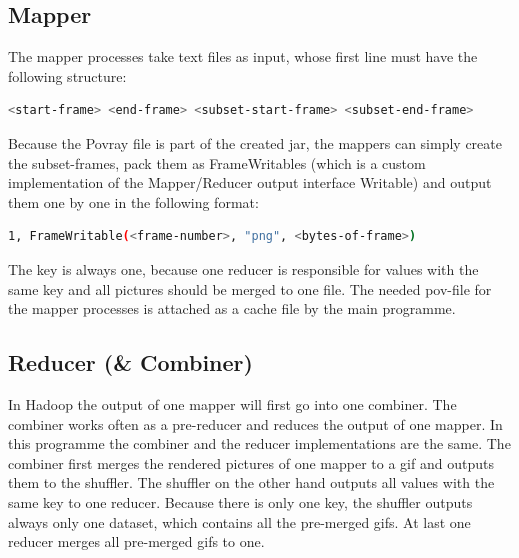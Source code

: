 \documentclass{article}
\begin{document}
\subsection{Mapper}

The mapper processes take text files as input, whose first line must have the following structure:

\begin{lstlisting}[language=bash, deletekeywords={cd}]
  <start-frame> <end-frame> <subset-start-frame> <subset-end-frame>
\end{lstlisting}

Because the Povray file is part of the created jar, the mappers can simply create the subset-frames, pack them as FrameWritables (which is a custom implementation of the Mapper/Reducer output interface Writable) and output them one by one in the following format:

\begin{lstlisting}[language=bash, deletekeywords={cd}]
  1, FrameWritable(<frame-number>, "png", <bytes-of-frame>)
\end{lstlisting}

The key is always one, because one reducer is responsible for values with the same key and all pictures should be merged to one file.
The needed pov-file for the mapper processes is attached as a cache file by the main programme.

\subsection{Reducer (\& Combiner)}
In Hadoop the output of one mapper will first go into one combiner. The combiner works often as a pre-reducer and reduces the output of one mapper. In this programme the combiner and the reducer implementations are the same. The combiner first merges the rendered pictures of one mapper to a gif and outputs them to the shuffler. The shuffler on the other hand outputs all values with the same key to one reducer. Because there is only one key, the shuffler outputs always only one dataset, which contains all the pre-merged gifs. At last one reducer merges all pre-merged gifs to one.
\end{document}
